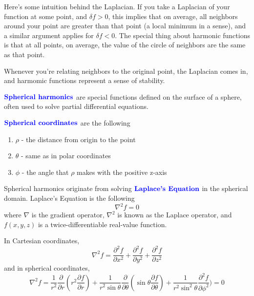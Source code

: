 \documentclass[12pt]{scrartcl}
\begin{document}
\begin{note}
    Here's some intuition behind the Laplacian. If you take a Laplacian of your function at some point, and $\delta f > 0$, this implies that on average, all neighbors around your point are greater than that point (a local minimum in a sense), and a similar argument applies for $\delta f < 0$. The special thing about harmonic functions is that at all points, on average, the value of the circle of neighbors are the same as that point.

    Whenever you're relating neighbors to the original point, the Laplacian comes
    in, and harmomic functions represent a sense of stability.
\end{note}

\begin{definition}
    $\textbf{\color{blue} Spherical harmonics}$ are special functions defined on the surface of a sphere, often used to solve partial differential equations.
\end{definition}

\begin{definition}
    $\textbf{\color{blue} Spherical coordinates}$ are the following
    \begin{enumerate}
        \item $\rho$ - the distance from origin to the point
        \item $\theta$ - same as in polar coordinates
        \item $\phi$ - the angle that $\rho$ makes with the positive z-axis
    \end{enumerate}
\end{definition}

\begin{lemma}
    Spherical harmonics originate from solving $\textbf{\color{blue} Laplace's Equation}$ in the spherical domain. Laplace's Equation is the following
    \[\nabla^2 f = 0\] where $\nabla$ is the gradient operator, $\nabla^2$ is known as the Laplace
    operator, and $f(x,y,z)$ is a twice-differentiable real-value function.

    In Cartesian coordinates,
    \[\nabla^2f = \frac{\partial^2 f}{\partial x^2} + \frac{\partial^2 f }{\partial y^2} + \frac{\partial^2 f}{\partial z^2}\]
    and in spherical coordinates,
    \[\nabla^2f = \frac{1}{r^2}\frac{\partial}{\partial r}(r^2 \frac{\partial f}{\partial r}) + \frac{1}{r^2\sin\theta}\frac{\partial}{\partial \theta}(\sin \theta \frac{\partial f}{\partial \theta}) + \frac{1}{r^2\sin^2\theta}\frac{\partial^2 f}{\partial \phi^2}) = 0\]
\end{lemma}
\end{document}
